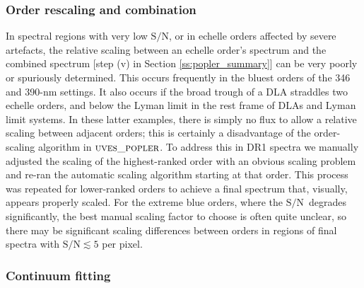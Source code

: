 \documentclass[fleqn,usenatbib,usedcolumn]{mnras}
\renewcommand{\la}{\lesssim} %
\newcommand{\Sref}[1]{Section \ref{#1}}
\newcommand{\SN}{\ensuremath{\textrm{S/N}}}
\newcommand{\popler}{\ensuremath{\textsc{uves\_popler}}}
\begin{document}
\subsubsection{Order rescaling and combination}\label{sss:combination}

In spectral regions with very low \SN, or in echelle orders affected by severe artefacts, the relative scaling between an echelle order's spectrum and the combined spectrum [step (v) in \Sref{ss:popler_summary}] can be very poorly or spuriously determined. This occurs frequently in the bluest orders of the 346 and 390-nm settings. It also occurs if the broad trough of a DLA straddles two echelle orders, and below the Lyman limit in the rest frame of DLAs and Lyman limit systems. In these latter examples, there is simply no flux to allow a relative scaling between adjacent orders; this is certainly a disadvantage of the order-scaling algorithm in \popler. To address this in DR1 spectra we manually adjusted the scaling of the highest-ranked order with an obvious scaling problem and re-ran the automatic scaling algorithm starting at that order. This process was repeated for lower-ranked orders to achieve a final spectrum that, visually, appears properly scaled. For the extreme blue orders, where the \SN\ degrades significantly, the best manual scaling factor to choose is often quite unclear, so there may be significant scaling differences between orders in regions of final spectra with $\SN\la5$ per pixel.

\subsubsection{Continuum fitting}\label{sss:continuum}
\end{document}
